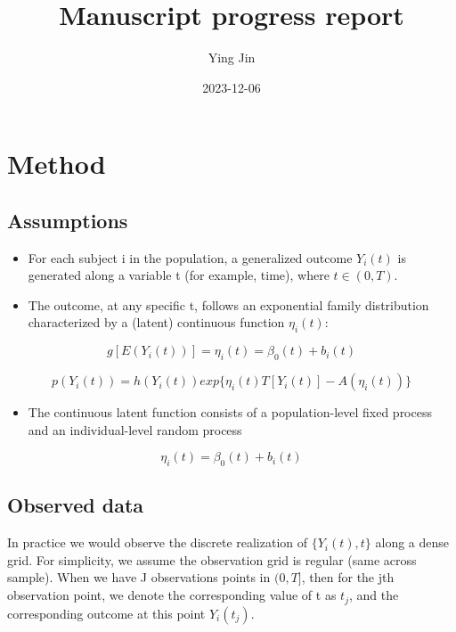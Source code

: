 \documentclass[
]{article}
\title{Manuscript progress report}
\author{Ying Jin}
\date{2023-12-06}
\providecommand{\tightlist}{%
  \setlength{\itemsep}{0pt}\setlength{\parskip}{0pt}}
\begin{document}
\maketitle

{
\setcounter{tocdepth}{3}
\tableofcontents
}
\hypertarget{method}{%
\section{Method}\label{method}}

\hypertarget{assumptions}{%
\subsection{Assumptions}\label{assumptions}}

\begin{itemize}
\tightlist
\item
  For each subject i in the population, a generalized outcome \(Y_i(t)\)
  is generated along a variable t (for example, time), where
  \(t \in (0, T)\).
\item
  The outcome, at any specific t, follows an exponential family
  distribution characterized by a (latent) continuous function
  \(\eta_i(t)\):
\end{itemize}

\[g[E(Y_i(t))] = \eta_i(t) = \beta_0(t)+b_i(t)\]

\[p(Y_i(t)) = h(Y_i(t))exp\{\eta_i(t)T[Y_i(t)]-A(\eta_i(t))\}\]

\begin{itemize}
\tightlist
\item
  The continuous latent function consists of a population-level fixed
  process and an individual-level random process
\end{itemize}

\[\eta_i(t) = \beta_0(t)+b_i(t)\]

\hypertarget{observed-data}{%
\subsection{Observed data}\label{observed-data}}

In practice we would observe the discrete realization of
\(\{Y_i(t), t\}\) along a dense grid. For simplicity, we assume the
observation grid is regular (same across sample). When we have J
observations points in \((0, T]\), then for the jth observation point,
we denote the corresponding value of t as \(t_j\), and the corresponding
outcome at this point \(Y_i(t_j)\).
\end{document}
